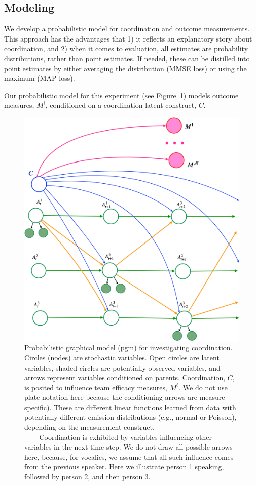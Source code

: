 \subsection{Modeling}
    We develop a probabilistic model for coordination and outcome measurements.
    This approach has the advantages that 1) it reflects an explanatory story
    about coordination, and 2) when it comes to evaluation, all estimates are
    probability distributions, rather than point estimates.  If needed, these
    can be distilled into point estimates by either averaging the distribution
    (MMSE loss) or using the maximum (MAP loss). 

    Our probabilistic model for this experiment (see  Figure~\ref{fig:pgm})
    models outcome measures, $M^i$, conditioned on a coordination latent construct, $C$. 
%
    \begin{figure}
    \label{fig:pgm}
    \includegraphics[width=6in]{images/prereg-pgm.pdf}
    \caption{Probabilistic graphical model (pgm) for investigating coordination.
    Circles (nodes) are stochastic variables. 
    Open circles are latent variables, shaded circles are potentially observed
    variables, and arrows represent variables conditioned on parents.
    Coordination, $C$, is posited to influence team efficacy measures, $M^i$.
    We do not use plate notation here because the conditioning arrows are
    measure specific). These are different linear functions learned from data with potentially
    different emission distributions (e.g., normal or Poisson), depending on the
    measurement construct. \\
    $~~~~~~~~$ Coordination is exhibited by variables influencing other variables in the
    next time step. We do not draw all possible arrows here, because, for
    vocalics, we assume that all  such influence comes from the previous speaker.
    Here we illustrate person 1 speaking, followed by person 2, and then person 3.  }
    \end{figure}
